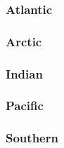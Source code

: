 		\subsubsection{Atlantic}
		\subsubsection{Arctic}
		\subsubsection{Indian}
		\subsubsection{Pacific}
		\subsubsection{Southern}
		
		
